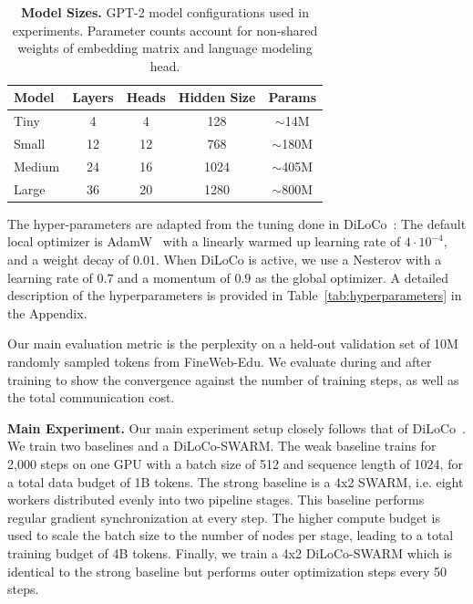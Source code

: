 \documentclass{article}
\begin{document}
\begin{table}[h]
\centering
\begin{tabular}{lcccc}
\toprule
\textbf{Model} & \textbf{Layers} & \textbf{Heads} & \textbf{Hidden Size} & \textbf{Params} \\
\midrule
Tiny & 4 & 4 & 128 & $\sim$14M \\
Small & 12 & 12 & 768 & $\sim$180M \\
Medium & 24 & 16 & 1024 & $\sim$405M \\
Large & 36 & 20 & 1280 & $\sim$800M \\
\bottomrule
\end{tabular}
\caption{\textbf{Model Sizes.} GPT-2 model configurations used in experiments.
Parameter counts account for non-shared weights of embedding matrix and language
modeling head.}
\label{tab:models}
\end{table}

The hyper-parameters are adapted from the tuning done in
DiLoCo~\cite{douillard2023diloco}: The default local optimizer is
AdamW~\cite{loshchilov2019adamw} with a linearly warmed up learning rate of
$4\cdot 10^{-4}$, and a weight decay of $0.01$. When DiLoCo is active, we use a
Nesterov with a learning rate of $0.7$ and a momentum of $0.9$ as the global
optimizer. A detailed description of the hyperparameters is provided in
Table~\ref{tab:hyperparameters} in the Appendix.

Our main evaluation metric is the perplexity on a held-out validation set of 10M
randomly sampled tokens from FineWeb-Edu. We evaluate during and after training
to show the convergence against the number of training steps, as well as the
total communication cost.

\textbf{Main Experiment.} Our main experiment setup closely follows that of
DiLoCo~\cite{douillard2023diloco}. We train two baselines and a DiLoCo-SWARM.
The weak baseline trains for 2,000 steps on one GPU with a batch size of 512 and
sequence length of 1024, for a total data budget of 1B tokens. The strong
baseline is a 4x2 SWARM, i.e. eight workers distributed evenly into two pipeline
stages. This baseline performs regular gradient synchronization at every step.
The higher compute budget is used to scale the batch size to the number of nodes
per stage, leading to a total training budget of 4B tokens. Finally, we train a
4x2 DiLoCo-SWARM which is identical to the strong baseline but performs outer
optimization steps every 50 steps.
\end{document}
